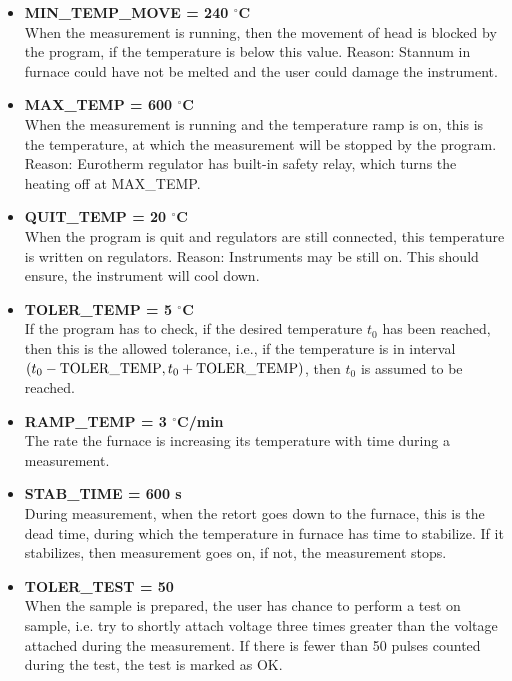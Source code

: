 \documentclass[a4paper,11pt,oneside]{report}
\theoremstyle{named}
\begin{document}
\begin{itemize}
  \item \textbf{MIN\_TEMP\_MOVE = 240 $^{\circ}$C} \\
    When the measurement is running, then the movement of head is blocked by the
    program, if the temperature is below this value. Reason: Stannum in furnace
    could have not be melted and the user could damage the instrument.  
  \item \textbf{MAX\_TEMP = 600 $^{\circ}$C} \\
    When the measurement is running and the temperature ramp is on, this is the
    temperature, at which the measurement will be stopped by the program.
    Reason: Eurotherm regulator has built-in safety relay, which turns the
    heating off at MAX\_TEMP.
  \item \textbf{QUIT\_TEMP = 20 $^{\circ}$C} \\
    When the program is quit and regulators are still connected, this
    temperature is written on regulators. Reason: Instruments may be still on.
    This should ensure, the instrument will cool down.
  \item \textbf{TOLER\_TEMP = 5 $^{\circ}$C} \\
    If the program has to check, if the desired temperature $t_0$ has been
    reached, then this is the allowed tolerance, i.e., if the temperature is in
    interval $(t_0 - {\rm TOLER\_TEMP}, t_0 + {\rm TOLER\_TEMP})$, then 
    $t_0$ is assumed to be reached.  
  \item \textbf{RAMP\_TEMP = 3 $^{\circ}$C/min} \\
    The rate the furnace is increasing its temperature with time during a
    measurement.
  \item \textbf{STAB\_TIME = 600 s} \\
    During measurement, when the retort goes down to the furnace, this is the
    dead time, during which the temperature in furnace has time to stabilize. If it
    stabilizes, then measurement goes on, if not, the measurement stops. 
  \item \textbf{TOLER\_TEST = 50} \\
    When the sample is prepared, the user has chance to perform a test on
    sample, i.e. try to shortly attach voltage three times greater than the voltage
    attached during the measurement. If there is fewer than 50 pulses counted
    during the test, the test is marked as OK.
\end{itemize}
\end{document}
